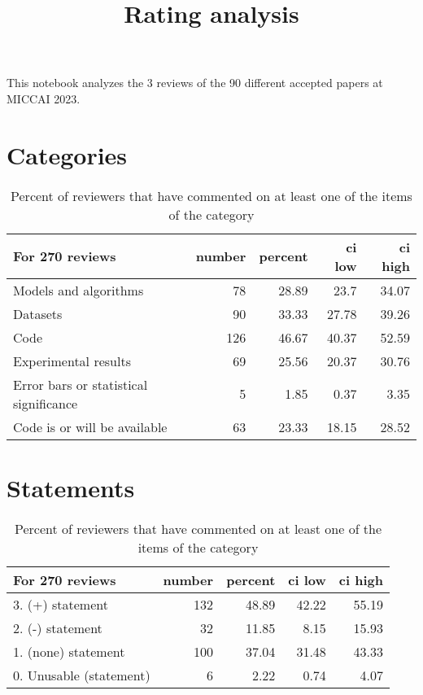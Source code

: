 \documentclass{article}
\title{Rating analysis}
\begin{document}
\maketitle

This notebook analyzes the 3 reviews of the 90 different accepted papers at MICCAI 2023.

\section{Categories} 

\begin{table}[H]

\centering

\begin{tabular}{lrrrr}
\hline
 For 270 reviews                        &   number &   percent &   ci low &   ci high \\
\hline
 Models and algorithms                  &       78 &     28.89 &    23.7  &     34.07 \\
 Datasets                               &       90 &     33.33 &    27.78 &     39.26 \\
 Code                                   &      126 &     46.67 &    40.37 &     52.59 \\
 Experimental results                   &       69 &     25.56 &    20.37 &     30.76 \\
 Error bars or statistical significance &        5 &      1.85 &     0.37 &      3.35 \\
 Code is or will be available           &       63 &     23.33 &    18.15 &     28.52 \\
\hline
\end{tabular}\caption{Percent of reviewers that have commented on at least one of the items of the category}

\end{table}



\section{Statements} 

\begin{table}[H]

\centering

\begin{tabular}{lrrrr}
\hline
 For 270 reviews         &   number &   percent &   ci low &   ci high \\
\hline
 3. (+) statement        &      132 &     48.89 &    42.22 &     55.19 \\
 2. (-) statement        &       32 &     11.85 &     8.15 &     15.93 \\
 1. (none) statement     &      100 &     37.04 &    31.48 &     43.33 \\
 0. Unusable (statement) &        6 &      2.22 &     0.74 &      4.07 \\
\hline
\end{tabular}\caption{Percent of reviewers that have commented on at least one of the items of the category}

\end{table}
\end{document}
